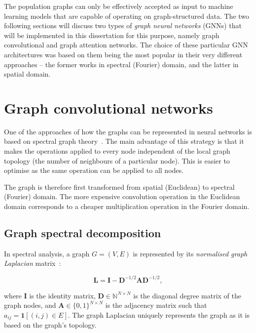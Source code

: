 The population graphs can only be effectively accepted as input to machine learning models that are capable of operating on graph-structured data. The two following sections will discuss two types of \textit{graph neural networks} (GNNs) that will be implemented in this dissertation for this purpose, namely graph convolutional and graph attention networks. The choice of these particular GNN architectures was based on them being the most popular in their very different approaches – the former works in spectral (Fourier) domain, and the latter in spatial domain.

\section{Graph convolutional networks}
\label{training-gcn}

One of the approaches of how the graphs can be represented in neural networks is based on spectral graph theory~\cite{hammond2011wavelets}. The main advantage of this strategy is that it makes the operations applied to every node independent of the local graph topology (the number of neighbours of a particular node). This is easier to optimise as the same operation can be applied to all nodes. 

The graph is therefore first transformed from spatial (Euclidean) to spectral (Fourier) domain. The more expensive convolution operation in the Euclidean domain corresponds to a cheaper multiplication operation in the Fourier domain.

\subsection{Graph spectral decomposition}

In spectral analysis, a graph $G = (V, E)$ is represented by its \textit{normalised graph Laplacian} matrix~\cite{defferrard2016convolutional}: 

\begin{equation}
    \mathbf{L} = \mathbf{I} - \mathbf{D}^{-1/2}\mathbf{A}\mathbf{D}^{-1/2},
\end{equation}

where $\mathbf{I}$ is the identity matrix, $\mathbf{D} \in \mathbb{N}^{N \times N}$ is the diagonal degree matrix of the graph nodes, and $\mathbf{A} \in \{0, 1\}^{N \times N}$ is the adjacency matrix such that $a_{ij} = \mathbf{1}[(i, j) \in E]$. The graph Laplacian uniquely represents the graph as it is based on the graph's topology.


